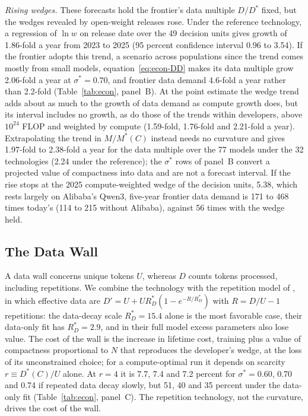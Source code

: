 \textit{Rising wedges.} These forecasts hold the frontier's data multiple $D/D^*$ fixed, but the wedges revealed by
open-weight releases rose. Under the reference technology, a regression of $\ln w$ on release date over the 49 decision
units gives growth of 1.86-fold a year from 2023 to 2025 (95 percent confidence interval 0.96 to 3.54). If the frontier
adopts this trend, a scenario across populations since the trend comes mostly from small models,
equation~\eqref{eq:econ-DD} makes its data multiple grow 2.06-fold a year at $\sigma^*=0.70$, and frontier data demand
4.6-fold a year rather than 2.2-fold (Table~\ref{tab:econ}, panel~B). At the point estimate the wedge trend adds about
as much to the growth of data demand as compute growth does, but its interval includes no growth, as do those of the
trends within developers, above $10^{24}$ FLOP and weighted by compute (1.59-fold, 1.76-fold and 2.21-fold a year).
Extrapolating the trend in $M/M^*(C)$ instead needs no curvature and gives 1.97-fold to 2.38-fold a year for the data
multiple over the 77 models under the 32 technologies (2.24 under the reference); the $\sigma^*$ rows of panel~B
convert a projected value of compactness into data and are not a forecast interval. If the rise stops at the 2025
compute-weighted wedge of the decision units, 5.38, which rests largely on Alibaba's Qwen3, five-year frontier data
demand is 171 to 468 times today's (114 to 215 without Alibaba), against 56 times with the wedge held.

\subsection{The Data Wall}\label{sec:econ-wall}

A data wall concerns unique tokens $U$, whereas $D$ counts tokens processed, including repetitions. We combine the
technology with the repetition model of \citet{muennighoff2023scaling}, in which effective data are
$D'=U+UR^*_D(1-e^{-R/R^*_D})$ with $R=D/U-1$ repetitions: the data-decay scale $R^*_D=15.4$ alone is the most favorable
case, their data-only fit has $R^*_D=2.9$, and in their full model excess parameters also lose value. The cost of the
wall is the increase in lifetime cost, training plus a value of compactness proportional to $N$ that reproduces the
developer's wedge, at the loss of its unconstrained choice; for a compute-optimal run it depends on scarcity
$r\equiv D^*(C)/U$ alone. At $r=4$ it is
7.7, 7.4 and 7.2 percent for $\sigma^*=0.60$, 0.70 and 0.74 if repeated data decay slowly, but 51, 40 and 35 percent
under the data-only fit (Table~\ref{tab:econ}, panel~C). The repetition technology, not the curvature, drives the cost of the wall.

